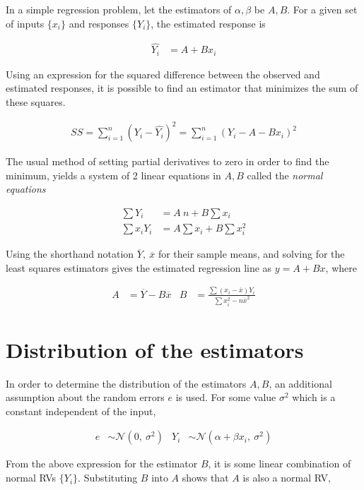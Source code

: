 In a simple regression problem, let the estimators of $ \alpha, \beta $ be $ A, B $. For a given set of inputs $ \{x_i\} $ and responses $ \{Y_i\} $, the estimated response is

\begin{align}
	\widehat{Y_i} &= A + Bx_i
\end{align}

Using an expression for the squared difference between the observed and estimated responses, it is possible to find an estimator that minimizes the sum of these squares.

\begin{align}
	SS = \sum\limits_{i = 1}^{n} (Y_i - \widehat{Y_i})^2 = \sum\limits_{i = 1}^{n} (Y_i - A - Bx_i)^2
\end{align}

The usual method of setting partial derivatives to zero in order to find the minimum, yields a system of 2 linear equations in $ A, B $ called the \textit{normal equations}

\begin{align}
	\sum Y_i & = A\ n +B \sum x_i\\
	\sum x_i Y_i & = A \sum x_i +B \sum x_i^2
\end{align}

Using the shorthand notation $ \overline{Y},\ \overline{x} $ for their sample means, and solving for the least squares estimators gives the estimated regression line as $ y = A + Bx $, where 

\begin{align}
	A &= \overline{Y} - B \overline{x} & B &= \frac{\sum (x_i - \overline{x}) Y_i}{\sum x_i^2  - n\overline{x}^2 }
\end{align}

\section{Distribution of the estimators}

In order to determine the distribution of the estimators $ A, B $, an additional assumption about the random errors $ e $ is used. For some value $ \sigma^2 $ which is a constant independent of the input,

\begin{align}
	e &\sim \mathcal{N}(0,\ \sigma^2) & Y_i &\sim \mathcal{N}(\alpha + \beta x_i,\ \sigma^2)
\end{align}

From the above expression for the estimator $ B $, it is some linear combination of normal RVs $ \{Y_i\} $. Substituting $ B $ into $ A $ shows that $ A $ is also a normal RV,

